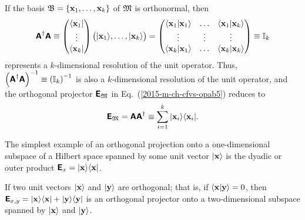 If the basis ${\frak B}= \left\{{\bf x}_1,\ldots ,{\bf x}_k \right\}$ of ${\frak M}$
is orthonormal, then
\begin{equation}
\begin{split}
\textsf{\textbf{A}}^\dagger
\textsf{\textbf{A}}
\equiv
\begin{pmatrix}
\langle {\bf x}_1 \vert \\ \vdots \\ \langle {\bf x}_k \vert
\end{pmatrix}
\begin{pmatrix}
\vert {\bf x}_1\rangle , \ldots , \vert {\bf x}_k \rangle
\end{pmatrix}
=
\begin{pmatrix}
\langle {\bf x}_1 \vert {\bf x}_1\rangle   & \ldots &    \langle {\bf x}_1 \vert {\bf x}_k\rangle \\
\vdots &  \vdots &   \vdots \\
\langle {\bf x}_k \vert {\bf x}_1\rangle   & \ldots &    \langle {\bf x}_k \vert {\bf x}_k\rangle \\
\end{pmatrix}
\equiv
{\Bbb I}_k
\end{split}
\end{equation}
represents a $k$-dimensional resolution of the unit operator.
Thus, $\left(\textsf{\textbf{A}}^\dagger  \textsf{\textbf{A}} \right)^{-1}\equiv \left({\Bbb I}_k\right)^{-1}$
is also a $k$-dimensional resolution of the unit operator,
and the orthogonal projector $\textsf{\textbf{E}}_{{\frak M}}$
in Eq.~(\ref{2015-m-ch-cfvs-opab5})
reduces to
\begin{equation}
\textsf{\textbf{E}}_{{\frak M}}=
\textsf{\textbf{A}}   \textsf{\textbf{A}}^\dagger
\equiv
\sum_{i=1}^k \vert {\bf x}_i \rangle \langle {\bf x}_i \vert
.
\end{equation}



{\color{blue}
\bexample
The simplest example of an orthogonal projection onto a one-dimensional subspace of a Hilbert space
spanned by some unit vector $\vert {\bf x} \rangle$ is the dyadic or outer product
$
\textsf{\textbf{E}}_x = \vert {\bf x} \rangle  \langle {\bf x} \vert$.

If two unit vectors $\vert {\bf x} \rangle$ and $\vert {\bf y} \rangle$ are orthogonal;
that is, if $\langle {\bf x} \vert {\bf y} \rangle = 0$, then
$\textsf{\textbf{E}}_{x,y} = \vert {\bf x} \rangle  \langle {\bf x} \vert  +  \vert {\bf y} \rangle  \langle {\bf y} \vert$
is an orthogonal projector onto a two-dimensional subspace spanned by $\vert {\bf x} \rangle$ and $\vert {\bf y} \rangle$.
\eexample
}

